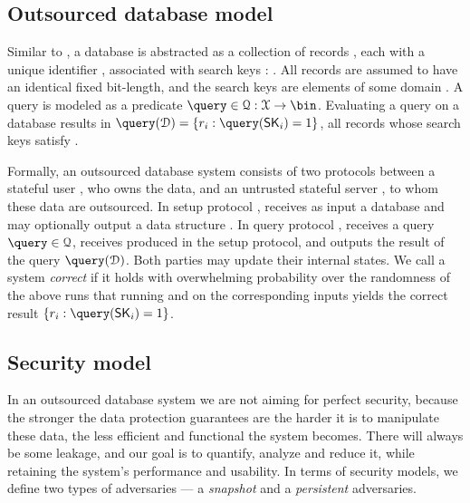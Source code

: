 		\subsection{Outsourced database model}\label{section:introduction:model:odb}

			Similar to \cite{epsolute}, a database is abstracted as a collection of \dataSize{} records \record{}, each with a unique identifier \recordID{}, associated with search keys \searchKey{}: \databaseDef{}.
			All records are assumed to have an identical fixed bit-length, and the search keys are elements of some domain \searchKeyDomain{}.
			A query is modeled as a predicate $\query \in \querySet: \searchKeyDomain \to \bin$.
			Evaluating a query \query{} on a database \database{} results in $\query( \database ) = \{ \record_i : \query( \searchKey_i ) = 1 \}$, all records whose search keys satisfy \query{}.

			Formally, an outsourced database system consists of two protocols between a stateful user \user{}, who owns the data, and an untrusted stateful server \server{}, to whom these data are outsourced.
			In setup protocol \protocolSetup{}, \user{} receives as input a database \databaseDef{} and \server{} may optionally output a data structure \serverDS{}.
			In query protocol \protocolQuery{}, \user{} receives a query $\query \in \querySet$, \server{} receives \serverDS{} produced in the setup protocol, and \user{} outputs the result of the query $\query( \database )$.
			Both parties may update their internal states.
			We call a system \emph{correct} if it holds with overwhelming probability over the randomness of the above runs that running \protocolSetup{} and  \protocolQuery{} on the corresponding inputs yields the correct result $\{ \record_i : \query( \searchKey_i ) = 1 \}$.

		\subsection{Security model}

			In an outsourced database system we are not aiming for perfect security, because the stronger the data protection guarantees are the harder it is to manipulate these data, the less efficient and functional the system becomes.
			There will always be some leakage, and our goal is to quantify, analyze and reduce it, while retaining the system's performance and usability.
			In terms of security models, we define two types of adversaries --- a \emph{snapshot} and a \emph{persistent} adversaries.

